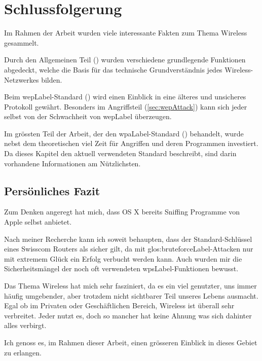 \chapter{Schlussfolgerung}

Im Rahmen der Arbeit wurden viele interessante Fakten zum Thema Wireless gesammelt.

Durch den Allgemeinen Teil () wurden verschiedene grundlegende Funktionen abgedeckt, welche die Basis für das technische Grundverständnis jedes Wireless-Netzwerkes bilden.

Beim \gls{wepLabel}-Standard () wird einen Einblick in eine älteres und unsicheres Protokoll gewährt.
Besonders im Angriffsteil (\cref{sec:wepAttack}) kann sich jeder selbst von der Schwachheit von \gls{wepLabel} überzeugen.

Im grössten Teil der Arbeit, der den \gls{wpaLabel}-Standard () behandelt, wurde nebst dem theoretischen viel Zeit für Angriffen und deren Programmen investiert.
Da dieses Kapitel den aktuell verwendeten Standard beschreibt, sind darin vorhandene Informationen am Nützlichsten.


\section{Persönliches Fazit}
Zum Denken angeregt hat mich, dass OS X bereits Sniffing Programme von Apple selbst anbietet.

Nach meiner Recherche kann ich soweit behaupten, dass der Standard-Schlüssel eines Swisscom Routers als sicher gilt, da mit \gls{glos:bruteforceLabel}-Attacken nur mit extremem Glück ein Erfolg verbucht werden kann.
Auch wurden mir die Sicherheitsmängel der noch oft verwendeten \gls{wpsLabel}-Funktionen bewusst.

Das Thema Wireless hat mich sehr fasziniert, da es ein viel genutzter, uns immer häufig umgebender, aber trotzdem nicht sichtbarer Teil unseres Lebens ausmacht.
Egal ob im Privaten oder Geschäftlichen Bereich, Wireless ist überall sehr verbreitet.
Jeder nutzt es, doch so mancher hat keine Ahnung was sich dahinter alles verbirgt.

Ich genoss es, im Rahmen dieser Arbeit, einen grösseren Einblick in dieses Gebiet zu erlangen.
